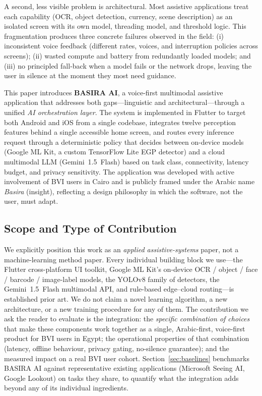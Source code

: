 \documentclass[11pt,a4paper]{article}
\begin{document}
A second, less visible problem is architectural. Most assistive applications
treat each capability (OCR, object detection, currency, scene description) as
an isolated screen with its own model, threading model, and threshold logic.
This fragmentation produces three concrete failures observed in the field:
(i) inconsistent voice feedback (different rates, voices, and interruption
policies across screens); (ii) wasted compute and battery from redundantly
loaded models; and (iii) no principled fall-back when a model fails or the
network drops, leaving the user in silence at the moment they most need
guidance.

This paper introduces \textbf{BASIRA AI}, a voice-first multimodal assistive
application that addresses both gaps---linguistic and architectural---through
a unified \emph{AI orchestration layer}. The system is implemented in Flutter
to target both Android and iOS from a single codebase, integrates twelve
perception features behind a single accessible home screen, and routes every
inference request through a deterministic policy that decides between
on-device models (Google ML Kit, a custom TensorFlow Lite EGP detector) and
a cloud multimodal LLM (Gemini~1.5~Flash) based on task class, connectivity,
latency budget, and privacy sensitivity. The application was developed with
active involvement of BVI users in Cairo and is publicly framed under the
Arabic name \emph{Basira} (insight), reflecting a design philosophy in which
the software, not the user, must adapt.

\subsection{Scope and Type of Contribution}
\label{sec:scope}

We explicitly position this work as an \emph{applied assistive-systems}
paper, not a machine-learning method paper. Every individual building block
we use---the Flutter cross-platform UI toolkit, Google ML Kit's on-device
OCR / object / face / barcode / image-label models, the YOLOv8 family of
detectors, the Gemini~1.5~Flash multimodal API, and rule-based
edge--cloud routing---is established prior art. We do not claim a novel
learning algorithm, a new architecture, or a new training procedure for
any of them. The contribution we ask the reader to evaluate is the
integration: the \emph{specific combination of choices} that make these
components work together as a single, Arabic-first, voice-first product
for BVI users in Egypt; the operational properties of that combination
(latency, offline behaviour, privacy gating, no-silence guarantee); and
the measured impact on a real BVI user cohort. Section~\ref{sec:baselines}
benchmarks BASIRA AI against representative existing applications
(Microsoft Seeing AI, Google Lookout) on tasks they share, to quantify
what the integration adds beyond any of its individual ingredients.
\end{document}
